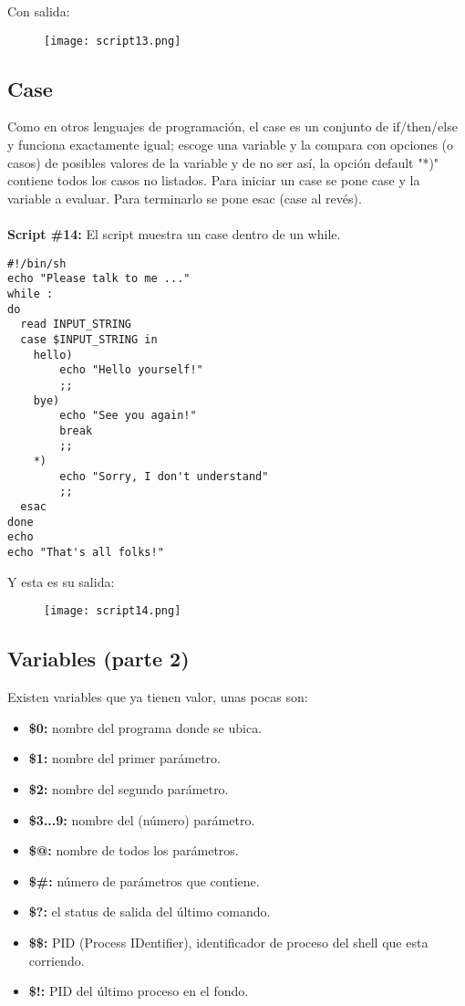 \documentclass[a4paper]{article}
\begin{document}
Con salida:
 \begin{figure}[h!]
  \texttt{[image: script13.png]}
  \centering
  \label{fig:26}
\end{figure}


\subsection{Case}
Como en otros lenguajes de programación, el case es un conjunto de if/then/else y funciona exactamente igual; escoge una variable y la compara con opciones (o casos) de posibles valores de la variable y de no ser así, la opción default "*)" contiene todos los casos no listados.  
Para iniciar un case se pone case y la variable a evaluar. Para terminarlo se pone esac (case al revés).\\
\\
\textbf{Script \#14:} El script muestra un case dentro de un while.
\begin{verbatim}
#!/bin/sh
echo "Please talk to me ..."
while :
do
  read INPUT_STRING
  case $INPUT_STRING in
	hello)
		echo "Hello yourself!"
		;;
	bye)
		echo "See you again!"
		break
		;;
	*)
		echo "Sorry, I don't understand"
		;;
  esac
done
echo 
echo "That's all folks!"
\end{verbatim}

Y esta es su salida:
 \begin{figure}[h!]
  \texttt{[image: script14.png]}
  \centering
  \label{fig:27}
\end{figure}

\subsection{Variables (parte 2)}
Existen variables que ya tienen valor, unas pocas son:
\begin{itemize}
\item \textbf{\$0:} nombre del programa donde se ubica.
\item \textbf{\$1:} nombre del primer parámetro.
\item \textbf{\$2:} nombre del segundo parámetro.
\item \textbf{\$3...9:} nombre del (número) parámetro.
\item \textbf{\$@:} nombre de todos los parámetros.
\item \textbf{\$\#:} número de parámetros que contiene.
\item \textbf{\$?:} el status de salida del último comando.
\item \textbf{\$\$:} PID (Process IDentifier), identificador de proceso del shell que esta corriendo. 
\item \textbf{\$!:} PID del último proceso en el fondo. 
\end{itemize}
\end{document}
